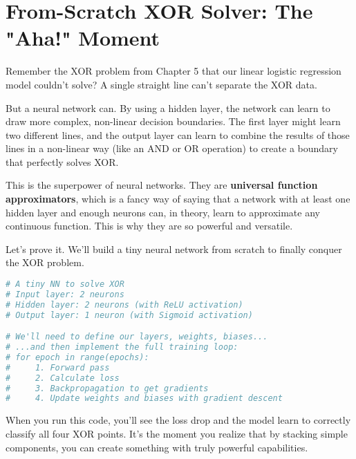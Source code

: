 \documentclass[11pt, letterpaper, openany]{book}
\begin{document}
\section{From-Scratch XOR Solver: The "Aha!" Moment}

Remember the XOR problem from Chapter 5 that our linear logistic regression model couldn't solve? A single straight line can't separate the XOR data.

But a neural network can. By using a hidden layer, the network can learn to draw more complex, non-linear decision boundaries. The first layer might learn two different lines, and the output layer can learn to combine the results of those lines in a non-linear way (like an AND or OR operation) to create a boundary that perfectly solves XOR.

This is the superpower of neural networks. They are \textbf{universal function approximators}, which is a fancy way of saying that a network with at least one hidden layer and enough neurons can, in theory, learn to approximate any continuous function. This is why they are so powerful and versatile.

Let's prove it. We'll build a tiny neural network from scratch to finally conquer the XOR problem.

\begin{lstlisting}[language=Python]
# A tiny NN to solve XOR
# Input layer: 2 neurons
# Hidden layer: 2 neurons (with ReLU activation)
# Output layer: 1 neuron (with Sigmoid activation)

# We'll need to define our layers, weights, biases...
# ...and then implement the full training loop:
# for epoch in range(epochs):
#     1. Forward pass
#     2. Calculate loss
#     3. Backpropagation to get gradients
#     4. Update weights and biases with gradient descent
\end{lstlisting}

When you run this code, you'll see the loss drop and the model learn to correctly classify all four XOR points. It's the moment you realize that by stacking simple components, you can create something with truly powerful capabilities.
\end{document}
